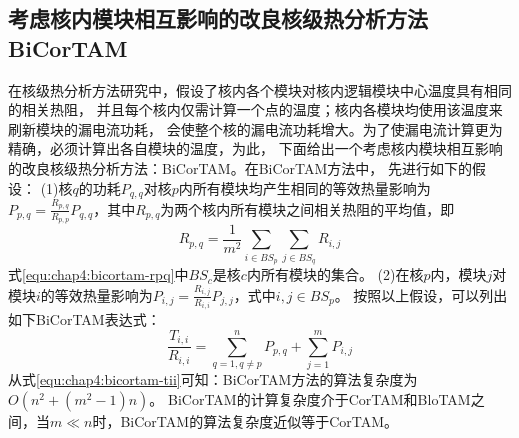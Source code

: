 \subsection{考虑核内模块相互影响的改良核级热分析方法BiCorTAM}
在核级热分析方法研究中，假设了核内各个模块对核内逻辑模块中心温度具有相同的相关热阻， 并且每个核内仅需计算一个点的温度；核内各模块均使用该温度来刷新模块的漏电流功耗， 会使整个核的漏电流功耗增大。为了使漏电流计算更为精确，必须计算出各自模块的温度，为此， 下面给出一个考虑核内模块相互影响的改良核级热分析方法：BiCorTAM。在BiCorTAM方法中， 先进行如下的假设：
(1)核$q$的功耗$P_{q,q}$对核$p$内所有模块均产生相同的等效热量影响为$P_{p,q} = \frac{R_{p,q}}{R_{p,p}}P_{q,q}$，其中$R_{p,q}$为两个核内所有模块之间相关热阻的平均值，即
\begin{equation}
\label{equ:chap4:bicortam-rpq}
R_{p,q} = \frac{1}{m^2}\sum\limits_{i \in BS_p}\sum\limits_{j \in BS_q}R_{i,j}
\end{equation}
式\ref{equ:chap4:bicortam-rpq}中$BS_c$是核$c$内所有模块的集合。
(2)在核$p$内，模块$j$对模块$i$的等效热量影响为$P_{i,j} = \frac{R_{i,j}}{R_{i,i}}P_{j,j}$，式中$i,j \in BS_p$。
按照以上假设，可以列出如下BiCorTAM表达式：
\begin{equation}
\label{equ:chap4:bicortam-tii}
\frac{T_{i,i}}{R_{i,i}} = \sum\limits_{q=1,q\neq p}^n P_{p,q} + \sum\limits_{j=1}^m P_{i,j}
\end{equation}
从式\ref{equ:chap4:bicortam-tii}可知：BiCorTAM方法的算法复杂度为$O(n^2+(m^2-1)n)$。 BiCorTAM的计算复杂度介于CorTAM和BloTAM之间，当$m \ll n$时，BiCorTAM的算法复杂度近似等于CorTAM。

